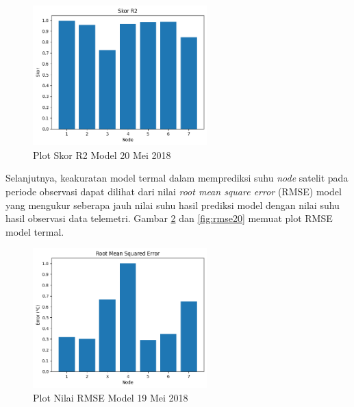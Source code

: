 \begin{figure}[H]
\setlength{}
\begin{center}
\includegraphics[width=0.6\textwidth]{fig/r2_2018-05-20.png}
\caption{Plot Skor R2 Model 20 Mei 2018}
\label{fig:r220}
\end{center}
\end{figure}

Selanjutnya, keakuratan model termal dalam memprediksi suhu \textit{node} satelit pada
periode observasi dapat dilihat dari nilai \textit{root mean square error} (RMSE)
model yang mengukur seberapa jauh nilai suhu hasil prediksi model dengan nilai
suhu hasil observasi data telemetri. Gambar \ref{fig:rmse19} dan
\ref{fig:rmse20} memuat plot RMSE model termal. 

\begin{figure}[H]
\setlength{}
\begin{center}
\includegraphics[width=0.6\textwidth]{fig/rmse_2018-05-19.png}
\caption{Plot Nilai RMSE Model 19 Mei 2018}
\label{fig:rmse19}
\end{center}
\end{figure}

